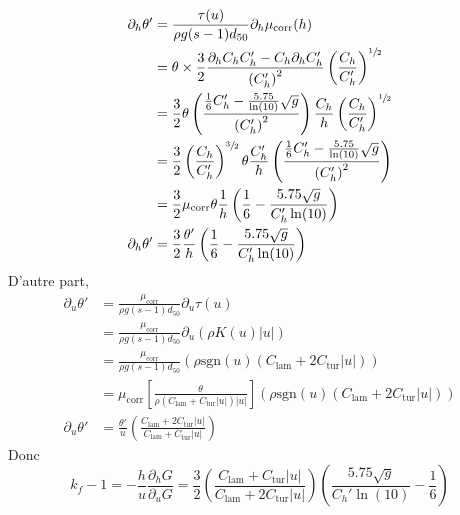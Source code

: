 \documentclass[11pt, a4paper, oneside]{report}
\begin{document}
\begin{equation}
    \begin{aligned}
        \partial_h \theta' & = \frac{\tau(u)}{\rho g (s-1) d_{50}} \partial_h \mu_\text{corr}(h) \\
        & = \theta \times \frac{3}{2} \frac{\partial_h C_h C_h' - C_h \partial_h C_h'}{\left( C_h' \right)^2} \left( \frac{C_h}{C_h'} \right)^{\sfrac{1}{2}} \\
        & = \frac{3}{2} \theta \left( \frac{\frac{1}{6} C_h' - \frac{5.75}{\ln(10)} \sqrt{g}}{\left( C_h' \right)^2} \right) \frac{C_h}{h} \left( \frac{C_h}{C_h'} \right)^{\sfrac{1}{2}} \\
        & = \frac{3}{2} \left( \frac{C_h}{C_h'} \right)^{\sfrac{3}{2}} \theta \frac{C_h'}{h} \left( \frac{\frac{1}{6} C_h' - \frac{5.75}{\ln(10)} \sqrt{g}}{\left( C_h' \right)^2} \right) \\
        & = \frac{3}{2} \mu_\text{corr} \theta \frac{1}{h} \left( \frac{1}{6} - \frac{5.75 \sqrt{g}}{C_h' \ln(10)} \right) \\
        \partial_h \theta' & = \frac{3}{2} \frac{\theta'}{h} \left( \frac{1}{6} - \frac{5.75 \sqrt{g}}{C_h' \ln(10)} \right)
    \end{aligned}
\end{equation}
D'autre part,
\begin{equation}
    \begin{aligned}
        \partial_u \theta' & = \frac{\mu_\text{corr}}{\rho g (s-1) d_{50}} \partial_u \tau(u) \\
        & = \frac{\mu_\text{corr}}{\rho g (s-1) d_{50}} \partial_u \left( \rho K(u) \lvert u \rvert \right) \\
        & = \frac{\mu_\text{corr}}{\rho g (s-1) d_{50}} \left( \rho \text{sgn}(u) \left( C_\text{lam} + 2C_\text{tur} \lvert u \rvert \right) \right) \\
        & = \mu_\text{corr} \left[ \frac{\theta}{\rho \left( C_\text{lam} + C_\text{tur} \lvert u \rvert \right) \lvert u \rvert} \right] \left( \rho \text{sgn}(u) \left( C_\text{lam} + 2C_\text{tur} \lvert u \rvert \right) \right) \\
        \partial_u \theta' & = \frac{\theta'}{u} \left( \frac{C_\text{lam} + 2 C_\text{tur} \lvert u \rvert}{C_\text{lam} + C_\text{tur} \lvert u \rvert} \right)
    \end{aligned}
\end{equation}
Donc
\begin{equation}
    k_f - 1 = - \frac{h}{u} \frac{\partial_h G}{\partial_u G} = \frac{3}{2} \left( \frac{C_\text{lam} + C_\text{tur} \lvert u \rvert}{C_\text{lam} + 2 C_\text{tur} \lvert u \rvert} \right) \left( \frac{5.75 \sqrt{g}}{C_h' \ln(10)} - \frac{1}{6} \right)
\end{equation}
\end{document}
